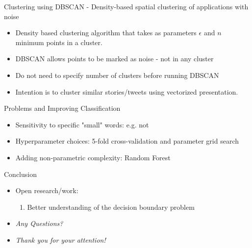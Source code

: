 \documentclass{beamer}
\begin{document}
\begin{frame}{Clustering using DBSCAN - Density-based spatial clustering of applications with noise}

\begin{itemize}
    \item Density based clustering algorithm that takes as parameters $\epsilon$ and $n$ minimum points in a cluster. 
    \item DBSCAN allows points to be marked as noise - not in any cluster
    \item Do not need to specify number of clusters before running DBSCAN
    \item Intention is to cluster similar stories/tweets using vectorized presentation. 
\end{itemize}

\end{frame}

\begin{frame}{Problems and Improving Classification}

\begin{itemize}
	\item Sensitivity to specific "small" words: e.g. not
\end{itemize}

\begin{itemize}
	\item Hyperparameter choices: 5-fold cross-validation and parameter grid search
	\item Adding non-parametric complexity: Random Forest
\end{itemize}

\end{frame}


\begin{frame}{Conclusion}

\begin{itemize}
\item Open research/work:
\begin{enumerate}
\item Better understanding of the decision boundary problem
\end{enumerate}
\item \Large{\textit{Any Questions?}}
\item \Large{\textit{Thank you for your attention!}}
\end{itemize}


\end{frame}
\end{document}
